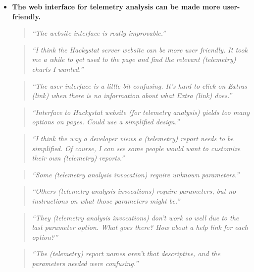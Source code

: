 \begin{itemize}
  \item \textbf{The web interface for telemetry analysis can be made more user-friendly.}
    \begin{quote} \textit{``The website interface is really improvable.''} \end{quote}
    \begin{quote} \textit{``I think the Hackystat server website can be more user
           friendly. It took me a while to get used to the page and find the 
           relevant (telemetry) charts I wanted.''} \end{quote}  
    \begin{quote} \textit{``The user interface is a little bit confusing. 
           It's hard to click on Extras (link) when there is no information about 
           what Extra (link) does.''} \end{quote}
    \begin{quote} \textit{``Interface to Hackystat website 
          (for telemetry analysis) yields too many options on pages. 
           Could use a simplified design.''} \end{quote}
    \begin{quote} \textit{``I think the way a developer views a (telemetry) report 
           needs to be simplified. Of course, I can see some people would want to
           customize their own (telemetry) reports.''} \end{quote}  
    \begin{quote} \textit{``Some (telemetry analysis invocation) require 
           unknown parameters.''} \end{quote}
    \begin{quote} \textit{``Others (telemetry analysis invocations) require 
           parameters, but no instructions on what those parameters 
           might be.''} \end{quote}
    \begin{quote} \textit{``They (telemetry analysis invocations) don't work 
           so well due to the last parameter option. What goes there? 
           How about a help link for each option?''} \end{quote}  
    \begin{quote} \textit{``The (telemetry) report names aren't that descriptive, 
           and the parameters needed were confusing.''} \end{quote}   
             
\end{itemize}







